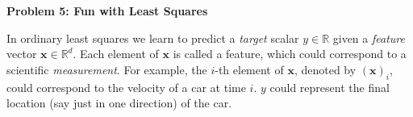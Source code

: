 \documentclass{article}\usepackage[utf8]{inputenc}\usepackage[margin=0.4cm,top=0.4cm,bottom=0.4cm]{geometry}\usepackage[usenames,dvipsnames,svgnames,table]{xcolor}
\begin{document}
\vspace{-2mm}\noindent\begin{mybox}{\begin{center}\textbf{\color{black}Problem 5: Fun with Least Squares}\end{center}}\end{mybox}\vspace{-2mm}
\vspace{10pt}
\noindent In ordinary least squares we learn to predict a \textit{target} scalar $y \in \mathbb{R}$ given a \textit{feature} vector $\mathbf{x} \in \mathbb{R}^d$. Each element of $\mathbf{x}$ is called a feature, which could correspond to a scientific \textit{measurement}. For example, the $i$-th element of $\mathbf{x}$, denoted by $(\mathbf{x})_i$, could correspond to the velocity of a car at time $i$. $y$ could represent the final location (say just in one direction) of the car.
\vspace{3pt}
\end{document}
